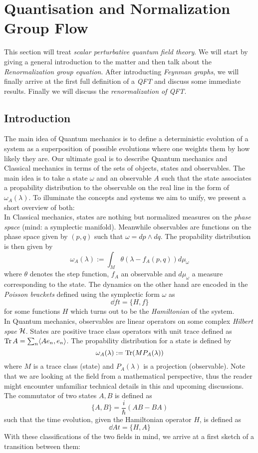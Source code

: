 \section{Quantisation and Normalization Group Flow}
\label{sec:Renormalization}

This section will treat \emph{scalar perturbative quantum field theory}. We will start by giving a general introduction to the matter and then talk about the \emph{Renormalization group equation}. After introducting \emph{Feynman graphs}, we will finally arrive at the first full definition of a \emph{QFT} and discuss some immediate results. Finally we will discuss the \emph{renormalization of QFT}.

\subsection{Introduction}
\label{subsec:quantisation_intro}

The main idea of Quantum mechanics is to define a deterministic evolution of a system as a superposition of possible evolutions where one weights them by how likely they are. Our ultimate goal is to describe Quantum mechanics and Classical mechanics in terms of the sets of objects, states and observables. The main idea is to take a state $\omega$ and an observable $A$ such that the state associates a propability distribution to the observable on the real line in the form of $\omega_A(\lambda)$. To illuminate the concepts and systems we aim to unify, we present a short overview of both:\\

In Classical mechanics, states are nothing but normalized measures on the \emph{phase space} (mind: a symplectic manifold). Meanwhile observables are functions on the phase space given by $(p,q)$ such that $\omega = dp \wedge dq$. The propability distribution is then given by
$$ \omega_A (\lambda) := \int_M \theta(\lambda - f_A (p,q)) d \mu_\omega$$
where $\theta$ denotes the step function, $f_A$ an observable and $d\mu_\omega$ a measure corresponding to the state. The dynamics on the other hand are encoded in the \emph{Poisson brackets} defined using the symplectic form $\omega$ as
$$ \dd{f}{t} = \{H, f\} $$
for some functions $H$ which turns out to be the \emph{Hamiltonian} of the system.\\

In Quantum mechanics, observables are linear operators on some complex \emph{Hilbert spae} ${\mathcal{H}}$. States are positive trace class operators with unit trace defined as $\operatorname{Tr} A = \sum_n \langle A e_n, e_n \rangle$. The propability distribution for a state is defined by
$$ \omega_A (\lambda) := \operatorname{Tr}(M P_A(\lambda)) $$
where $M$ is a trace class (state) and $P_A(\lambda)$ is a projection (observable). Note that we are looking at the field from a mathematical perspective, thus the reader might encounter unfamiliar technical details in this and upcoming discussions.\\
The commutator of two states $A,B$ is defined as
$$ \{A,B\} = \frac{i}{\hbar} (AB-BA) $$
such that the time evolution, given the Hamiltonian operator $H$, is defined as
$$ \dd{A}{t} = \{H,A\} $$
With these classifications of the two fields in mind, we arrive at a first sketch of a transition between them:

